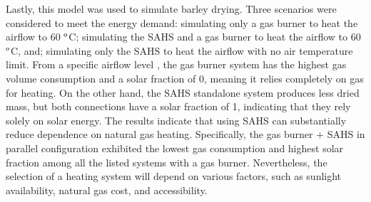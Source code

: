 Lastly, this model was used to simulate barley drying. Three scenarios were considered to meet the energy demand: simulating only a gas burner to heat the airflow to 60 $^{\rm{o}}$C; simulating the SAHS and a gas burner to heat the airflow to 60 $^{\rm{o}}$C, and; simulating only the SAHS to heat the airflow with no air temperature limit. From a specific airflow level , the gas burner system has the highest gas volume consumption and a solar fraction of 0, meaning it relies completely on gas for heating. On the other hand, the SAHS standalone system produces less dried mass, but both connections have a solar fraction of 1, indicating that they rely solely on solar energy. The results indicate that using SAHS can substantially reduce dependence on natural gas heating. Specifically, the gas burner + SAHS in parallel configuration exhibited the lowest gas consumption and highest solar fraction among all the listed systems with a gas burner. Nevertheless, the selection of a heating system will depend on various factors, such as sunlight availability, natural gas cost, and accessibility.




